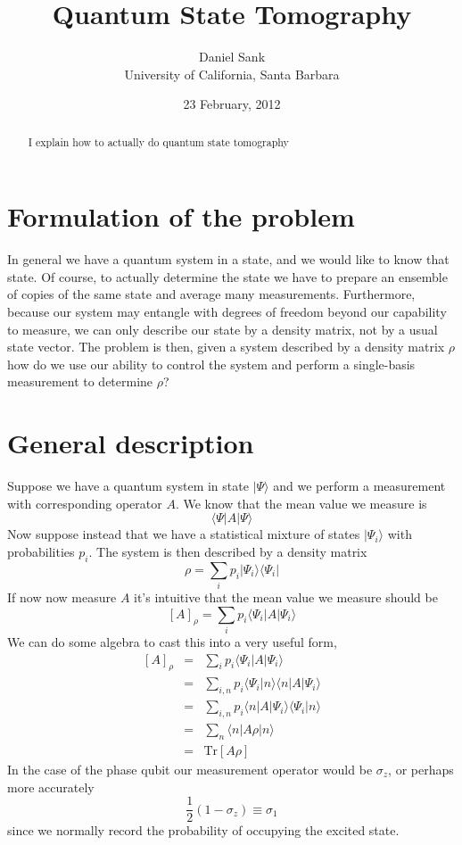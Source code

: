 \documentclass[twocolumn]{article}
\title{Quantum State Tomography}
\date{23 February, 2012}
\author{Daniel Sank \\ \small{University of California, Santa Barbara}}
\newcommand{\bra}[1]{\langle #1|}
\newcommand{\ket}[1]{|#1\rangle}
\newcommand{\braket}[2]{\langle #1|#2\rangle}
\begin{document}
\maketitle

\begin{abstract}
I explain how to actually do quantum state tomography
\end{abstract}

\section{Formulation of the problem}

In general we have a quantum system in a state, and we would like to know that state. Of course, to actually determine the state we have to prepare an ensemble of copies of the same state and average many measurements. Furthermore, because our system may entangle with degrees of freedom beyond our capability to measure, we can only describe our state by a density matrix, not by a usual state vector. The problem is then, given a system described by a density matrix $\rho$ how do we use our ability to control the system and perform a single-basis measurement to determine $\rho$?

\section{General description}

Suppose we have a quantum system in state $\ket{\Psi}$ and we perform a measurement with corresponding operator $A$. We know that the mean value we measure is \begin{equation}
\bra{\Psi}A\ket{\Psi} \end{equation}
Now suppose instead that we have a statistical mixture of states $\ket{\Psi_i}$ with probabilities $p_i$. The system is then described by a density matrix \begin{equation}
\rho = \sum_i p_i \ket{\Psi_i}\bra{\Psi_i} \end{equation}
If now now measure $A$ it's intuitive that the mean value we measure should be \begin{equation}
\left[ A \right]_{\rho} = \sum_i p_i \bra{\Psi_i}A\ket{\Psi_i} \end{equation}
We can do some algebra to cast this into a very useful form,
\begin{eqnarray}
\left[ A \right]_{\rho} &=& \sum_i p_i \bra{\Psi_i}A\ket{\Psi_i} \\
& = & \sum_{i,n} p_i \braket{\Psi_i}{n}\braket{n}{A|\Psi_i} \\
& = & \sum_{i,n} p_i \braket{n}{A|\Psi_i}\braket{\Psi_i}{n} \\
& = & \sum_n \braket{n}{A\rho|n} \\
& = & \textrm{Tr} \left[ A \rho \right]
\end{eqnarray}
In the case of the phase qubit our measurement operator would be $\sigma_z$, or perhaps more accurately \begin{equation}
\frac{1}{2}\left(1 - \sigma_z \right) \equiv \sigma_1 \label{eq:1StateOperator} \end{equation}
since we normally record the probability of occupying the excited state.
\end{document}
